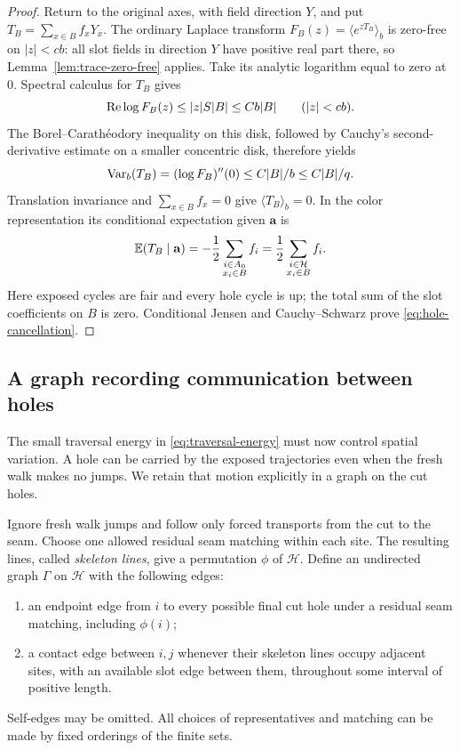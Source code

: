 \begin{proof}
Return to the original axes, with field direction $Y$, and put
$T_B=\sum_{x\in B}f_xY_x$.  The ordinary Laplace transform
$F_B(z)=\langle e^{zT_B}\rangle_b$ is zero-free on $|z|<cb$:
all slot fields in direction $Y$ have positive real part there,
so Lemma~\ref{lem:trace-zero-free} applies.  Take its analytic
logarithm equal to zero at $0$.  Spectral calculus for $T_B$ gives
\[
 \operatorname{Re}\log F_B(z)\le |z|S|B|\le Cb|B|\qquad(|z|<cb).
\]
The Borel--Carath\'eodory inequality on this disk, followed by
Cauchy's second-derivative estimate on a smaller concentric disk,
therefore yields
\[
 \operatorname{Var}_b(T_B)=(\log F_B)''(0)\le C|B|/b\le C|B|/q.
\]
Translation invariance and $\sum_{x\in B}f_x=0$ give
$\langle T_B\rangle_b=0$.  In the color representation its
conditional expectation given $\mathbf a$ is
\[
 \mathbb E(T_B\mid\mathbf a)
 =-\frac12\sum_{\substack{i\in A_0\\x_i\in B}}f_i
 =\frac12\sum_{\substack{i\in\mathcal H\\x_i\in B}}f_i.
\]
Here exposed cycles are fair and every hole cycle is up; the total
sum of the slot coefficients on $B$ is zero.  Conditional Jensen
and Cauchy--Schwarz prove \eqref{eq:hole-cancellation}.
\end{proof}

\subsection{A graph recording communication between holes}

The small traversal energy in \eqref{eq:traversal-energy} must now
control spatial variation.  A hole can be carried by the exposed
trajectories even when the fresh walk makes no jumps.  We retain
that motion explicitly in a graph on the cut holes.

Ignore fresh walk jumps and follow only forced transports from the
cut to the seam.  Choose one allowed residual seam matching within
each site.  The resulting lines, called \emph{skeleton lines}, give
a permutation $\phi$ of $\mathcal H$.  Define an undirected graph
$\Gamma$ on $\mathcal H$ with the following edges:
\begin{enumerate}[label=(\roman*),nosep]
 \item an endpoint edge from $i$ to every possible final cut hole
 under a residual seam matching, including $\phi(i)$;
 \item a contact edge between $i,j$ whenever their skeleton lines
 occupy adjacent sites, with an available slot edge between them,
 throughout some interval of positive length.
\end{enumerate}
Self-edges may be omitted.  All choices of representatives and
matching can be made by fixed orderings of the finite sets.

